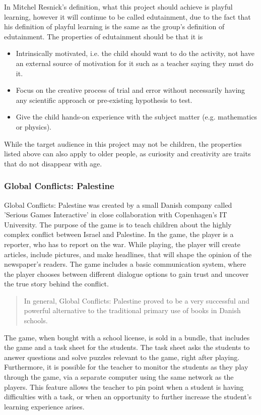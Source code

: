 In Mitchel Resnick's definition, what this project should achieve is playful learning, however it will continue to be called edutainment, due to the fact that his definition of playful learning is the same as the group's definition of edutainment. The properties of edutainment should be that it is

\begin{itemize}
\item Intrinsically motivated, i.e. the child should want to do the activity, not have an external source of motivation for it such as a teacher saying they must do it.
\item Focus on the creative process of trial and error without necessarily having any scientific approach or pre-existing hypothesis to test.
\item Give the child hands-on experience with the subject matter (e.g. mathematics or physics).
\end{itemize}\cite{edunoty}

While the target audience in this project  may not be children, the properties listed above can also apply to older people, as curiosity and creativity are traits that do not disappear with age.

\subsubsection{Global Conflicts: Palestine}

Global Conflicts: Palestine was created by a small Danish company called 'Serious Games Interactive' in close collaboration with Copenhagen's IT University.
The purpose of the game is to teach children about the highly complex conflict between Israel and Palestine.
In the game, the player is a reporter, who has to report on the war.
While playing, the player will create articles, include pictures, and make headlines, that will shape the opinion of the newspaper's readers.
The game includes a basic communication system, where the player chooses between different dialogue options to gain trust and uncover the true story behind the conflict. 
\begin{quote}
	In general, Global Conflicts: Palestine proved to be a very successful and powerful alternative to the traditional primary use of books in Danish schools.\cite{laeringpaaspil}
\end{quote}
The game, when bought with a school license, is sold in a bundle, that includes the game and a task sheet for the students.
The task sheet asks the students to answer questions and solve puzzles relevant to the game, right after playing.
Furthermore, it is possible for the teacher to monitor the students as they play through the game, via a separate computer using the same network as the players.
This feature allows the teacher to pin point when a student is having difficulties with a task, or when an opportunity to further increase the student's learning experience arises.\newline

